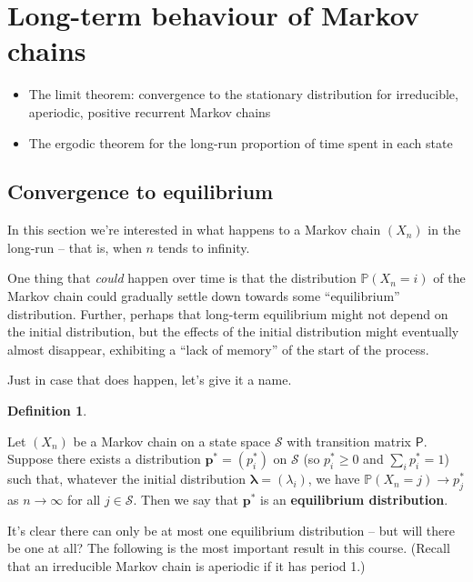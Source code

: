 \documentclass[
  a4paper,
]{article}
\providecommand{\tightlist}{%
  \setlength{\itemsep}{0pt}\setlength{\parskip}{0pt}}
\theoremstyle{definition}
\newtheorem{definition}{Definition}[section]
\theoremstyle{definition}
\theoremstyle{definition}
\theoremstyle{remark}
\begin{document}
\hypertarget{S11-long-term-chains}{%
\section{Long-term behaviour of Markov chains}\label{S11-long-term-chains}}

\begin{itemize}
\tightlist
\item
  The limit theorem: convergence to the stationary distribution for irreducible, aperiodic, positive recurrent Markov chains
\item
  The ergodic theorem for the long-run proportion of time spent in each state
\end{itemize}

\hypertarget{equilibrium}{%
\subsection{Convergence to equilibrium}\label{equilibrium}}

In this section we're interested in what happens to a Markov chain \((X_n)\) in the long-run -- that is, when \(n\) tends to infinity.

One thing that \emph{could} happen over time is that the distribution \(\mathbb P(X_n = i)\) of the Markov chain could gradually settle down towards some ``equilibrium'' distribution. Further, perhaps that long-term equilibrium might not depend on the initial distribution, but the effects of the initial distribution might eventually almost disappear, exhibiting a ``lack of memory'' of the start of the process.

Just in case that does happen, let's give it a name.

\begin{definition}
\protect\hypertarget{def:eq-dist}{}\label{def:eq-dist}

Let \((X_n)\) be a Markov chain on a state space \(\mathcal S\) with transition matrix \(\mathsf P\). Suppose there exists a distribution \(\mathbf p^* = (p_i^*)\) on \(\mathcal S\) (so \(p_i^* \geq 0\) and \(\sum_i p_i^* = 1\)) such that, whatever the initial distribution \(\boldsymbol\lambda = (\lambda_i)\), we have \(\mathbb P(X_n = j) \to p^*_j\) as \(n \to \infty\) for all \(j \in \mathcal S\). Then we say that \(\mathbf p^*\) is an \textbf{equilibrium distribution}.

\end{definition}

It's clear there can only be at most one equilibrium distribution -- but will there be one at all? The following is the most important result in this course. (Recall that an irreducible Markov chain is aperiodic if it has period 1.)
\end{document}
